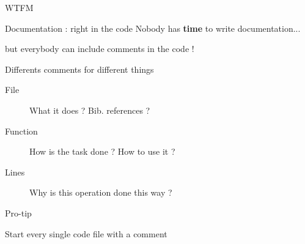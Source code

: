 \documentclass[10pt]{beamer}
\begin{document}
\begin{frame}{WTFM} %
	\begin{center}
	\end{center}

\end{frame}

\begin{frame}{Documentation : right in the code} %
	Nobody has \textbf{time} to write documentation...

	but everybody can include comments in the code !

	\pause
	\medskip

	\begin{block}{Differents comments for different things}
		\begin{description}
			\item[File] What it does ? Bib. references ?
			\item[Function] How is the task done ? How to use it ?
			\item[Lines] Why is this operation done this way ?
		\end{description}
	\end{block}

	\pause
	\medskip

	\begin{block}{Pro-tip}
		\begin{center}
			Start every single code file with a comment
		\end{center}
	\end{block}

\end{frame}
\end{document}
